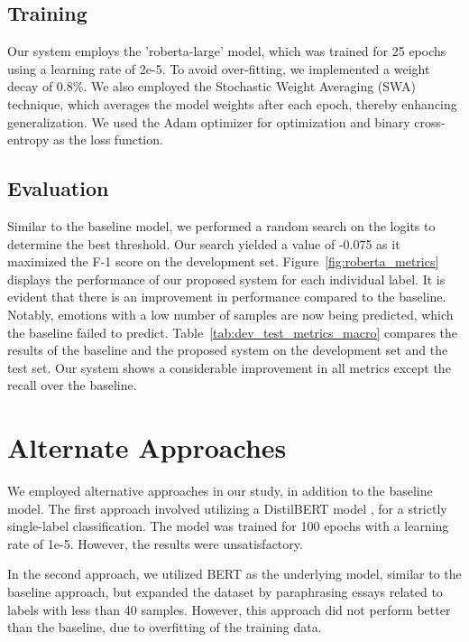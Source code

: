 \documentclass[11pt]{article}
\begin{document}
\subsection{Training}

Our system employs the 'roberta-large' model, which was trained for 25 epochs using a learning rate of 2e-5. To avoid over-fitting, we implemented a weight decay of 0.8\%. We also employed the Stochastic Weight Averaging (SWA) technique, which averages the model weights after each epoch, thereby enhancing generalization. We used the Adam optimizer for optimization and binary cross-entropy as the loss function.

\subsection{Evaluation}

Similar to the baseline model, we performed a random search on the logits to determine the best threshold. Our search yielded a value of -0.075 as it maximized the F-1 score on the development set. Figure~\ref{fig:roberta_metrics} displays the performance of our proposed system for each individual label. It is evident that there is an improvement in performance compared to the baseline. Notably, emotions with a low number of samples are now being predicted, which the baseline failed to predict. Table~\ref{tab:dev_test_metrics_macro} compares the results of the baseline and the proposed system on the development set and the test set. Our system shows a considerable improvement in all metrics except the recall over the baseline.

\section{Alternate Approaches}

We employed alternative approaches in our study, in addition to the baseline model. The first approach involved utilizing a DistilBERT model \citep{sanh2020distilbert}, for a strictly single-label classification. The model was trained for 100 epochs with a learning rate of 1e-5. However, the results were unsatisfactory.

In the second approach, we utilized BERT as the underlying model, similar to the baseline approach, but expanded the dataset by paraphrasing essays related to labels with less than 40 samples. However, this approach did not perform better than the baseline, due to overfitting of the training data.
\end{document}
